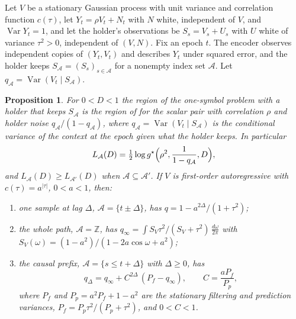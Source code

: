 \documentclass[11pt,onecolumn]{IEEEtran}
\newtheorem{proposition}[theorem]{Proposition}
\newcommand{\Var}{\operatorname{Var}}
\newcommand{\dw}{\tfrac{d\omega}{2\pi}}
\begin{document}
Let $V$ be a stationary Gaussian process with unit variance and
correlation function $c(\tau)$, let $Y_t=\rho V_t+N_t$ with $N$ white,
independent of $V$, and $\Var Y_t=1$, and let the holder's observations
be $S_s=V_s+U_s$ with $U$ white of variance $\tau^2>0$, independent of
$(V,N)$. Fix an epoch $t$. The encoder observes independent copies of
$(Y_t,V_t)$ and describes $Y_t$ under squared error, and the holder
keeps $S_{\mathcal A}=(S_s)_{s\in\mathcal A}$ for a nonempty index set
$\mathcal A$. Let
$q_{\mathcal A}=\Var(V_t\mid S_{\mathcal A})$.

\begin{proposition}\label{prop:retention}
For $0<D<1$ the region of the one-symbol problem with a holder that
keeps $S_{\mathcal A}$ is the region of \cite[Corollary~17]{part1} for
the scalar pair with correlation $\rho$ and holder noise
$q_{\mathcal A}/(1-q_{\mathcal A})$, where
$q_{\mathcal A}=\Var(V_t\mid S_{\mathcal A})$ is the conditional variance
of the context at the epoch given what the holder keeps. In particular
\[
L_{\mathcal A}(D)=\tfrac12\log g^\star\Bigl(\rho^2,\frac1{1-q_{\mathcal A}},D\Bigr),
\]
and $L_{\mathcal A}(D)\ge L_{\mathcal A'}(D)$ when
$\mathcal A\subseteq\mathcal A'$. If $V$ is first-order autoregressive
with $c(\tau)=a^{|\tau|}$, $0<a<1$, then:
\begin{enumerate}
\item[(a)] one sample at lag $\Delta$,
$\mathcal A=\{t\pm\Delta\}$, has
$q=1-a^{2\Delta}/(1+\tau^2)$;
\item[(b)] the whole path, $\mathcal A=\mathbb Z$, has
$q_\infty=\int S_V\tau^2/(S_V+\tau^2)\,\dw$ with
$S_V(\omega)=(1-a^2)/(1-2a\cos\omega+a^2)$;
\item[(c)] the causal prefix, $\mathcal A=\{s\le t+\Delta\}$ with
$\Delta\ge0$, has
\[
q_\Delta=q_\infty+C^{2\Delta}\,(P_f-q_\infty),\qquad C=\frac{aP_f}{P_p},
\]
where $P_f$ and $P_p=a^2P_f+1-a^2$ are the stationary filtering and
prediction variances, $P_f=P_p\tau^2/(P_p+\tau^2)$, and $0<C<1$.
\end{enumerate}
\end{proposition}
\end{document}
